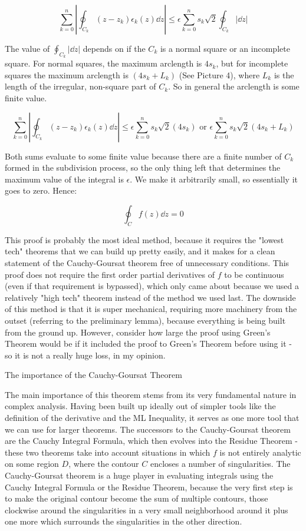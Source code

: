 \documentclass[11pt]{article}
\begin{document}
$$\sum_{k=0}^n\left|\oint_{C_k}(z-z_k)\epsilon_k(z)\dd{z}\right| \leq \epsilon \sum_{k=0}^n s_k\sqrt{2}\oint_{C_k}|\dd{z}|$$

The value of $\displaystyle{\oint_{C_k}|\dd{z}|}$ depends on if the $C_k$ is a normal square or an incomplete square. For normal squares, the maximum arclength is $4s_k$, but for incomplete squares the maximum arclength is $(4s_k + L_k)$ (See Picture 4), where $L_k$ is the length of the irregular, non-square part of $C_k$. So in general the arclength is some finite value.

$$\sum_{k=0}^n\left|\oint_{C_k}(z-z_k)\epsilon_k(z)\dd{z}\right| \leq \epsilon \sum_{k=0}^n s_k\sqrt{2}(4s_k) \text{  or  } \epsilon \sum_{k=0}^n s_k\sqrt{2}(4s_k + L_k)$$

Both sums evaluate to some finite value because there are a finite number of $C_k$ formed in the subdivision process, so the only thing left that determines the maximum value of the integral is $\epsilon$. We make it arbitrarily small, so essentially it goes to zero. Hence:

$$\oint_C f(z)\dd{z} = 0$$

This proof is probably the most ideal method, because it requires the "lowest tech" theorems that we can build up pretty easily, and it makes for a clean statement of the Cauchy-Goursat theorem free of unnecessary conditions. This proof does not require the first order partial derivatives of $f$ to be continuous (even if that requirement is bypassed), which only came about because we used a relatively "high tech" theorem instead of the method we used last. The downside of this method is that it is super mechanical, requiring more machinery from the outset (referring to the preliminary lemma), because everything is being built from the ground up. However, consider how large the proof using Green's Theorem would be if it included the proof to Green's Theorem before using it - so it is not a really huge loss, in my opinion.

{\centering{}The importance of the Cauchy-Goursat Theorem

}

The main importance of this theorem stems from its very fundamental nature in complex analysis. Having been built up ideally out of simpler tools like the definition of the derivative and the ML Inequality, it serves as one more tool that we can use for larger theorems. The successors to the Cauchy-Goursat theorem are the Cauchy Integral Formula, which then evolves into the Residue Theorem - these two theorems take into account situations in which $f$ is not entirely analytic on some region $D$, where the contour $C$ encloses a number of singularities. The Cauchy-Goursat theorem is a huge player in evaluating integrals using the Cauchy Integral Formula or the Residue Theorem, because the very first step is to make the original contour become the sum of multiple contours, those clockwise around the singularities in a very small neighborhood around it plus one more which surrounds the singularities in the other direction.
\end{document}
